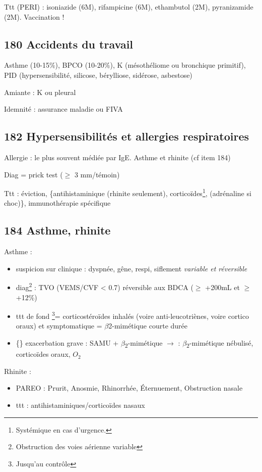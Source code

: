 \documentclass[11pt]{article}
\begin{document}
Ttt (PERI) : isoniazide (6M), rifampicine (6M), ethambutol (2M), pyranizamide (2M).
Vaccination !
\subsection{180 Accidents du travail}
\label{sec:org3948441}
Asthme (10-15\%), BPCO (10-20\%), K (mésothéliome ou bronchique primitif), PID
(hypersensibilité, silicose, bérylliose, sidérose, asbestose)

Amiante : K ou pleural

Idemnité : assurance maladie ou FIVA
\subsection{182 Hypersensibilités et allergies respiratoires}
\label{sec:orga61bcb6}
Allergie : le plus souvent médiée par IgE. Asthme et rhinite (cf item 184)

Diag = prick test (\diameter \(\ge\) 3 mm/témoin)

Ttt : éviction, \{antihistaminique (rhinite seulement), corticoïdes\footnote{Systémique en cas d'urgence.},
(adrénaline si choc)\}, immunothérapie spécifique
\subsection{184 Asthme, rhinite}
\label{sec:org98b5459}
Asthme :
\begin{itemize}
\item suspicion sur clinique : dyspnée, gêne, respi, siflement \emph{variable et réversible}
\item diag\footnote{Obstruction des voies aérienne variable} : TVO (VEMS/CVF < 0.7) réversible aux BDCA (\(\ge\) +200mL et \(\ge\) +12\%)
\item ttt de fond \footnote{Jusqu'au contrôle}= corticostéroïdes inhalés (voire anti-leucotriènes, voire cortico
oraux) et symptomatique = \(\beta\)2-mimétique courte durée
\item \{\} exacerbation grave : SAMU + \(\beta\)\textsubscript{2}-mimétique \(\rightarrow\) \faHospital : \(\beta\)\textsubscript{2}-mimétique nébulisé, corticoïdes
oraux, \(O_2\)
\end{itemize}
Rhinite : 
\begin{itemize}
\item PAREO : Prurit, Anosmie, Rhinorrhée, Éternuement, Obstruction nasale
\item ttt : antihistaminiques/corticoïdes nasaux
\end{itemize}
\end{document}
